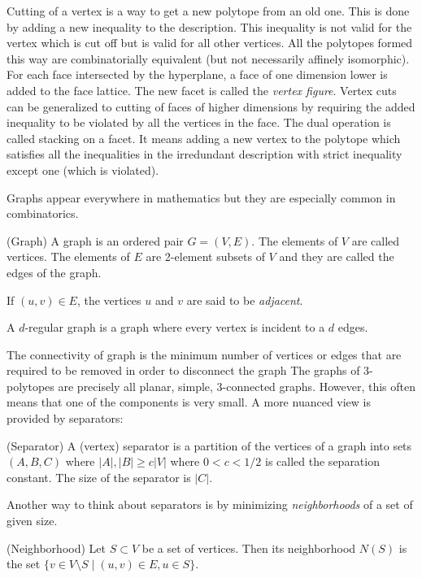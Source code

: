 Cutting of a vertex is a way to get a new polytope from an old one. This is 
done by adding a new inequality to the description. This inequality is not 
valid for the vertex which is cut off but is valid for all other vertices. All 
the polytopes formed this way are combinatorially equivalent (but not 
necessarily affinely isomorphic). For each face intersected by the hyperplane, 
a face of one dimension lower is added to the face lattice. The new facet is 
called the \textit{vertex figure}. Vertex cuts can be generalized to cutting of 
faces of higher dimensions by requiring the added inequality to be violated by 
all the vertices in the face. The dual operation is called stacking on a facet. 
It means adding a new vertex to the polytope which satisfies all the 
inequalities in the irredundant description with strict inequality except one 
(which is violated).

Graphs appear everywhere in mathematics but they are especially common in 
combinatorics. 

\begin{definition}
(Graph) A graph is an ordered pair $G=(V,E)$. The elements of $V$ are called 
vertices. The elements of $E$ are 2-element subsets of $V$ and they are called 
the edges of the graph. 
\end{definition}

If $(u,v) \in E$, the vertices $u$ and $v$ are said to be \textit{adjacent}.

A $d$-regular graph is a graph where every vertex is incident to a $d$ edges.

The connectivity of graph is the minimum number of vertices or edges that are 
required to be removed in order to disconnect the graph The graphs of 
3-polytopes are precisely all planar, simple, 3-connected graphs. However, this 
often means that one of the components is very small. A more nuanced view is 
provided 
by separators:

\begin{definition}
(Separator) A (vertex) separator is a partition of the vertices of a graph into 
sets $(A,B,C)$ where $|A|, |B| \geq c|V|$ where $0<c<1/2$ is called the 
separation 
constant. The size of the separator is $|C|$.  
\end{definition}

Another way to think about separators is by minimizing \textit{neighborhoods} 
of a set of given size.

\begin{definition}
 (Neighborhood) Let $S \subset V$ be a set of vertices. Then its neighborhood 
$N(S)$ is the set $\{v \in V\setminus S \mid (u,v) \in E, u \in S\}$. 
\end{definition}


